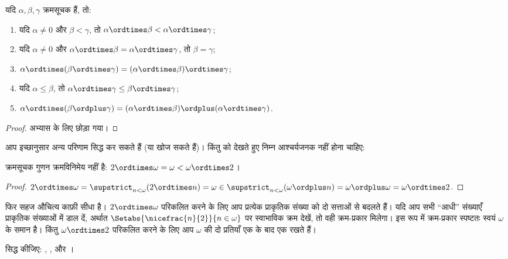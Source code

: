 \documentclass[../../../include/open-logic-section]{subfiles}
\begin{document}
\begin{lem}
यदि $\alpha, \beta, \gamma$ क्रमसूचक हैं, तो:
\begin{enumerate}
	\item{} यदि $\alpha \neq 0$ और $\beta < \gamma$,
	तो $\alpha \ordtimes \beta < \alpha \ordtimes \gamma$;
	\item{} यदि $\alpha \neq 0$ और
	$\alpha \ordtimes \beta = \alpha\ordtimes\gamma$, तो
	$\beta = \gamma$;
	\item{}  $\alpha \ordtimes (\beta \ordtimes
	\gamma) = (\alpha \ordtimes \beta) \ordtimes \gamma$;
	\item{} यदि $\alpha \leq \beta$, तो
	$\alpha \ordtimes \gamma \leq \beta \ordtimes \gamma$;
	\item{}  $\alpha \ordtimes (\beta \ordplus
	\gamma) = (\alpha \ordtimes \beta )\ordplus (\alpha\ordtimes
	\gamma)$.
\end{enumerate}
\end{lem}

\begin{proof}
अभ्यास के लिए छोड़ा गया।
\end{proof}

आप इच्छानुसार अन्य परिणाम सिद्ध कर सकते हैं (या खोज सकते हैं)। किंतु
 को देखते हुए निम्न आश्चर्यजनक
नहीं होना चाहिए:

\begin{prop}
क्रमसूचक गुणन क्रमविनिमेय नहीं है:
$2 \ordtimes \omega = \omega < \omega \ordtimes 2$।
\end{prop}

\begin{proof}
$2 \ordtimes \omega = \supstrict_{n < \omega}(2\ordtimes  n) = \omega \in \supstrict_{n < \omega}(\omega \ordplus n) = \omega \ordplus \omega = \omega \ordtimes 2$.
\end{proof}
\noindent 
फिर सहज औचित्य काफ़ी सीधा है। $2 \ordtimes \omega$ परिकलित करने के लिए आप
प्रत्येक प्राकृतिक संख्या को दो सत्ताओं से बदलते हैं। यदि आप सभी ``आधी''
संख्याएँ प्राकृतिक संख्याओं में डाल दें, अर्थात
$\Setabs{\nicefrac{n}{2}}{n \in \omega}$ पर स्वाभाविक क्रम देखें, तो वही
क्रम-प्रकार मिलेगा। इस रूप में क्रम-प्रकार स्पष्टतः स्वयं $\omega$ के समान
है। किंतु $\omega \ordtimes 2$ परिकलित करने के लिए आप $\omega$ की दो
प्रतियाँ एक के बाद एक रखते हैं।

\begin{prob}
सिद्ध कीजिए:
,
,
और
।
\end{prob}
\end{document}
